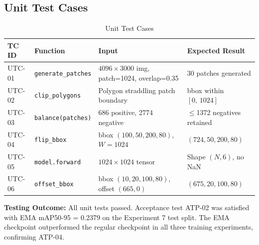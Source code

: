 \subsection*{Unit Test Cases}

\begin{table}[H]
\centering
\caption{Unit Test Cases}
\begin{tabular}{l p{3.5cm} p{4cm} p{3cm}}
\toprule
\rowcolor{tableHeader}
{\color{white}\bfseries TC ID} &
{\color{white}\bfseries Function} &
{\color{white}\bfseries Input} &
{\color{white}\bfseries Expected Result} \\
\midrule
UTC-01 & \texttt{generate\_patches} & $4096\times3000$ img, patch=1024, overlap=0.35 & 30 patches generated \\
\rowcolor{tableRowAlt}
UTC-02 & \texttt{clip\_polygons} & Polygon straddling patch boundary & bbox within $[0,\,1024]$ \\
UTC-03 & \texttt{balance(patches)} & 686 positive, 2774 negative & $\leq$1372 negatives retained \\
\rowcolor{tableRowAlt}
UTC-04 & \texttt{flip\_bbox} & bbox $(100,50,200,80)$, $W=1024$ & $(724,50,200,80)$ \\
UTC-05 & \texttt{model.forward} & $1024\times1024$ tensor & Shape $(N,6)$, no NaN \\
\rowcolor{tableRowAlt}
UTC-06 & \texttt{offset\_bbox} & bbox $(10,20,100,80)$, offset $(665,0)$ & $(675,20,100,80)$ \\
\bottomrule
\end{tabular}
\end{table}

\begin{findingbox}
\textbf{Testing Outcome:} All unit tests passed. Acceptance test ATP-02 was satisfied with EMA mAP50-95 = 0.2379 on the Experiment 7 test split. The EMA checkpoint outperformed the regular checkpoint in all three training experiments, confirming ATP-04.
\end{findingbox}
